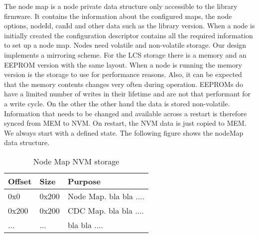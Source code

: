 The node map is a node private data structure only accessible to the library firmware. It contains the information about the configured maps, the node options, nodeId, canId and other data such as the library version. When a node is initially created the configuration descriptor contains all the required information to set up a node map. Nodes need volatile and non-volatile storage. Our design implements a mirroring scheme. For the LCS storage there is a memory and an EEPROM version with the same layout. When a node is running the memory version is the storage to use for performance reasons. Also, it can be expected that the memory contents changes very often during operation. EEPROMs do have a limited number of writes in their lifetime and are not that performant for a write cycle. On the other the other hand the data is stored non-volatile. Information that needs to be changed and available across a restart is therefore synced from MEM to NVM. On restart, the NVM data is just copied to MEM. We always start with a defined state. The following figure shows the nodeMap data structure.


\begin{table}[!ht]
    \begin{center}
        \caption{Node Map NVM storage}
        \begin{tabular}{|l|l|p{}|}
            \toprule
            \textbf{Offset} & \textbf{Size} & \textbf{Purpose} \\
            \midrule
            0x0 & 0x200 & Node Map. bla bla .... \\
            \midrule
            0x200 & 0x200 & CDC Map. bla bla .... \\
            \midrule
            ... & ... & bla bla ....\\
            \bottomrule
        \end{tabular}
    \end{center}
\end{table}

